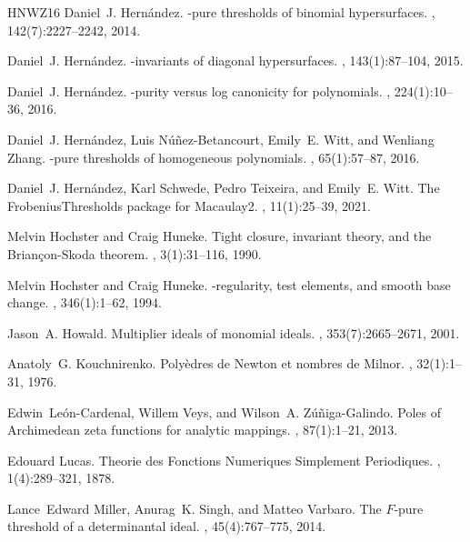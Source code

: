 \documentclass[12pt]{amsart}
\theoremstyle{definition}
\numberwithin{equation}{subsection}
\renewcommand{\!}[1]{{\color{red}\text{\Huge$\star$ }#1}}
\begin{document}
\begin{thebibliography}{HNWZ16}
	Daniel~J. Hern\'{a}ndez.
	-pure thresholds of binomial hypersurfaces.
	, 142(7):2227--2242, 2014.
	
	Daniel~J. Hern\'{a}ndez.
	-invariants of diagonal hypersurfaces.
	, 143(1):87--104, 2015.
	
	Daniel~J. Hern\'{a}ndez.
	-purity versus log canonicity for polynomials.
	, 224(1):10--36, 2016.
	
	Daniel~J. Hern\'{a}ndez, Luis {N\'{u}{\~n}ez-Betancourt}, Emily~E. Witt, and
	Wenliang Zhang.
	-pure thresholds of homogeneous polynomials.
	, 65(1):57--87, 2016.
	
	Daniel~J. Hern\'{a}ndez, Karl Schwede, Pedro Teixeira, and Emily~E. Witt.
	\newblock The {F}robenius{T}hresholds package for {M}acaulay2.
	, 11(1):25--39, 2021.
	
	Melvin Hochster and Craig Huneke.
	\newblock Tight closure, invariant theory, and the {B}rian\c con-{S}koda
	theorem.
	, 3(1):31--116, 1990.
	
	Melvin Hochster and Craig Huneke.
	-regularity, test elements, and smooth base change.
	, 346(1):1--62, 1994.
	
	Jason~A. Howald.
	\newblock Multiplier ideals of monomial ideals.
	, 353(7):2665--2671, 2001.
	
	Anatoly~G. Kouchnirenko.
	\newblock Poly\`edres de {N}ewton et nombres de {M}ilnor.
	, 32(1):1--31, 1976.
	
	Edwin~{Le\'{o}n-Cardenal}, Willem Veys, and Wilson~A. {Z\'{u}{\~n}iga-Galindo}.
	\newblock Poles of {A}rchimedean zeta functions for analytic mappings.
	, 87(1):1--21, 2013.
	
	Edouard Lucas.
	\newblock Theorie des {F}onctions {N}umeriques {S}implement {P}eriodiques.
	, 1(4):289--321, 1878.
	
	Lance~Edward Miller, Anurag~K. Singh, and Matteo Varbaro.
	\newblock The {$F$}-pure threshold of a determinantal ideal.
	, 45(4):767--775, 2014.
	

\end{thebibliography}
\end{document}
